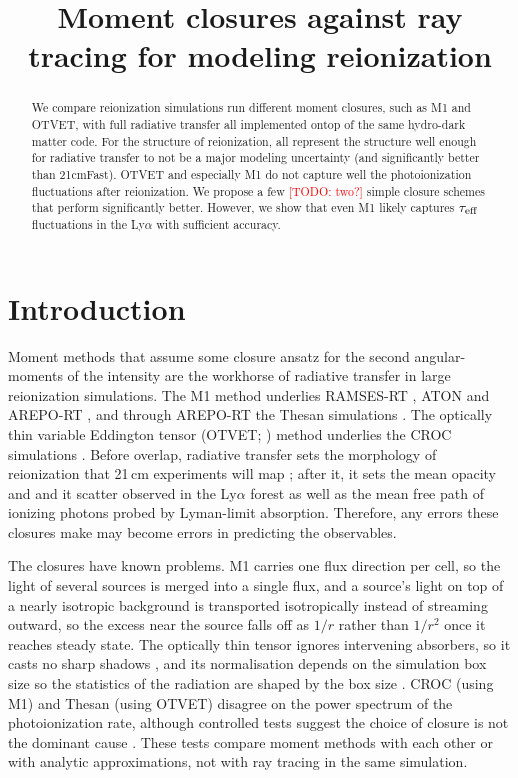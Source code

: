 \documentclass[11pt]{article}
\title{Moment closures against ray tracing for modeling reionization}
\author{\todo{authors}}
\newcommand{\todo}[1]{\textcolor{red}{[TODO: #1]}}
\begin{document}
\maketitle

\begin{abstract}
We compare reionization simulations run different moment closures, such as M1 and OTVET, with full radiative transfer all implemented ontop of the same hydro-dark matter code.  For the structure of reionization, all represent the structure well enough for radiative transfer to not be a major modeling uncertainty (and significantly better than 21cmFast).  OTVET and especially M1 do not capture well the photoionization fluctuations after reionization. We propose a few \todo{two?} simple closure schemes that perform significantly better.  However, we show that even M1 likely captures $\tau_{\rm eff}$ fluctuations in the Ly$\alpha$ with sufficient accuracy. 
\end{abstract}

\section{Introduction}
Moment methods that assume some closure ansatz for the second angular-moments of the intensity are the workhorse of radiative transfer in large reionization
simulations. The M1 method underlies RAMSES-RT \citep{rosdahl13}, ATON
\citep{aubert08} and AREPO-RT \citep{kannan19}, and through AREPO-RT the
Thesan simulations \citep{kannan22}. The optically thin variable Eddington
tensor (OTVET; \citealt{gnedin01}) method underlies the CROC simulations
\citep{gnedin14}. Before overlap, radiative transfer sets the morphology of reionization that
21\,cm experiments will map \citep{Furlanetto2006}; after it, it sets the mean opacity and and it scatter observed in the Ly$\alpha$ forest \citep{davies16,davies17} as well as the mean free path of ionizing photons probed by Lyman-limit absorption.  Therefore, any errors these closures make may become errors in predicting the observables.

The closures have known problems. M1 carries one flux direction per cell,
so the light of several sources is merged into a single flux, and a source’s light on top of a nearly isotropic background is transported isotropically instead of streaming outward, so the excess near the source falls off as $1/r$ rather than $1/r^2$ once it reaches steady state.  The optically thin tensor ignores intervening absorbers, so
it casts no sharp shadows \citep{gnedin01,petkova09}, and its
normalisation depends on the simulation box size so the statistics of the radiation are shaped by the box size \citep{wu21}. CROC (using M1) and Thesan (using OTVET) disagree
on the power spectrum of the photoionization rate, although controlled
tests suggest the choice of closure is not the dominant cause
\citep{gnedin25}. These tests compare moment methods with each other or
with analytic approximations, not with ray tracing in the same
simulation.
\end{document}

